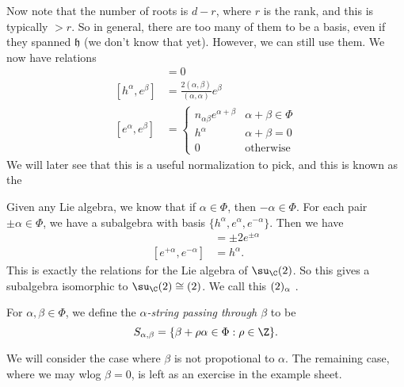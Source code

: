 \documentclass[a4paper]{article}
\begin{document}
Now note that the number of roots is $d - r$, where $r$ is the rank, and this is typically $ > r$. So in general, there are too many of them to be a basis, even if they spanned $\mathfrak{h}$ (we don't know that yet). However, we can still use them. We now have relations
\begin{align*}
  [h^\alpha, h^\beta] &= 0\\
  [h^\alpha, e^\beta] &= \frac{2(\alpha, \beta)}{(\alpha, \alpha)} e^\beta\\
  [e^\alpha, e^\beta] &=
  \begin{cases}
    n_{\alpha\beta} e^{\alpha + \beta} & \alpha + \beta \in \Phi\\
    h^\alpha & \alpha + \beta = 0\\
    0 & \text{otherwise}
  \end{cases}
\end{align*}
We will later see that this is a useful normalization to pick, and this is known as the %

\begin{eg}
  Given any Lie algebra, we know that if $\alpha \in \Phi$, then $-\alpha \in \Phi$. For each pair $\pm \alpha \in \Phi$, we have a subalgebra with basis $\{h^\alpha, e^\alpha, e^{-\alpha}\}$. Then we have
  \begin{align*}
    [h^\alpha, e^{\pm \alpha}] &= \pm 2 e^{\pm \alpha}\\
    [e^{+\alpha}, e^{-\alpha}] &= h^\alpha.
  \end{align*}
  This is exactly the relations for the Lie algebra of $\su_\C(2)$. So this gives a subalgebra isomorphic to $\su_{\C}(2) \cong \sl(2)$. We call this $\sl(2)_\alpha$ .
\end{eg}

\begin{defi}[String]
  For $\alpha, \beta \in \Phi$, we define the \emph{$\alpha$-string passing through $\beta$} to be
  \[
    S_{\alpha, \beta} = \{\beta + \rho\alpha \in \Phi: \rho \in \Z\}.
  \]
\end{defi}
We will consider the case where $\beta$ is not propotional to $\alpha$. The remaining case, where we may wlog $\beta = 0$, is left as an exercise in the example sheet.
\end{document}
